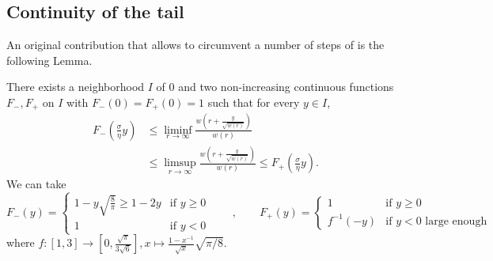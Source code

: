\documentclass[10pt,a4paper]{article}
\begin{document}
\subsection{Continuity of the tail}
\label{sec:lower-bound-ratio}


An original contribution that allows to circumvent a number of steps of \cite{lalley2015maximal} is the following Lemma. 


\begin{lemma}\label{lem:continuity-w-broad}
There exists a neighborhood $I$ of $0$ and two non-increasing continuous functions $F_-, F_+$ on $I$ with $F_-(0) = F_+(0) = 1$ such that for every $y\in I$, 
\begin{align}\label{eq:continuity-ratio-right}
F_-\left( \frac{\sigma}{\eta} y \right) 
&\leq \liminf_{r\to\infty} \frac{w\left( r + \frac{y}{\sqrt{w(r)}}\right)}{w(r)} \\
&\leq \limsup_{r\to\infty} \frac{w\left( r + \frac{y}{\sqrt{w(r)}}\right)}{w(r)} \leq F_+\left( \frac{\sigma}{\eta} y \right) . \label{eq:continuity-ratio-left}
\end{align}
We can take 
\begin{equation*}
F_-(y) = \begin{cases} 
1-y\sqrt{\frac{8}{\pi}} \geq 1-2y &\text{if } y\geq 0 \\
1 						&\text{if } y<0 
\end{cases} \qquad , \qquad 
F_+(y) = \begin{cases}
1 &\text{if } y\geq 0 \\
f^{-1}(-y) &\text{if }y<0 \text{ large enough}
\end{cases}
\end{equation*}
where $f: [1,3] \to [0, \frac{\sqrt{\pi}}{3\sqrt{6}}] , x\mapsto \frac{1-x^{-1}}{\sqrt{x}}\sqrt{\pi/8}$. 

\end{lemma}
\end{document}
